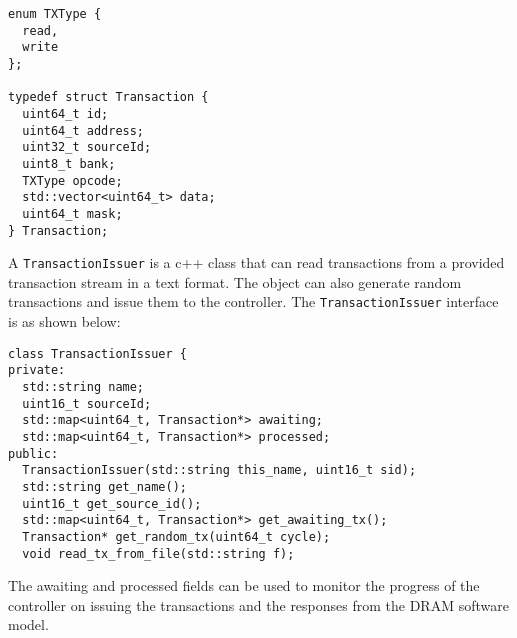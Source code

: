 \begin{verbatim}
enum TXType {
  read, 
  write
};

typedef struct Transaction {
  uint64_t id;
  uint64_t address;
  uint32_t sourceId;
  uint8_t bank;
  TXType opcode;
  std::vector<uint64_t> data;
  uint64_t mask;
} Transaction;
\end{verbatim}
A \verb|TransactionIssuer| is a c++ class that can read transactions from a provided transaction stream in a text format. The object can also generate random transactions and issue them to the controller.
The \verb|TransactionIssuer| interface is as shown below:
\begin{verbatim}
class TransactionIssuer {
private:
  std::string name;
  uint16_t sourceId;
  std::map<uint64_t, Transaction*> awaiting;
  std::map<uint64_t, Transaction*> processed;
public:
  TransactionIssuer(std::string this_name, uint16_t sid);
  std::string get_name();
  uint16_t get_source_id();
  std::map<uint64_t, Transaction*> get_awaiting_tx();
  Transaction* get_random_tx(uint64_t cycle);
  void read_tx_from_file(std::string f);
\end{verbatim}
The awaiting and processed fields can be used to monitor the progress of the controller on issuing the transactions and the responses from the DRAM software model. 
